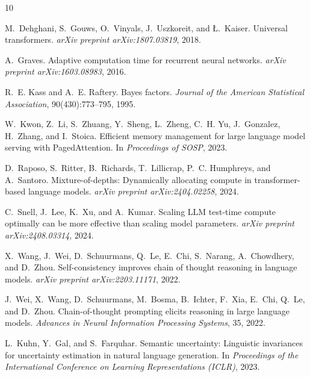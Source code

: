 \documentclass[11pt,a4paper]{article}
\begin{document}
\begin{thebibliography}{10}

M.~Dehghani, S.~Gouws, O.~Vinyals, J.~Uszkoreit, and {\L}.~Kaiser.
\newblock Universal transformers.
\newblock \emph{arXiv preprint arXiv:1807.03819}, 2018.

A.~Graves.
\newblock Adaptive computation time for recurrent neural networks.
\newblock \emph{arXiv preprint arXiv:1603.08983}, 2016.

R.~E. Kass and A.~E. Raftery.
\newblock Bayes factors.
\newblock \emph{Journal of the American Statistical Association}, 90(430):773--795, 1995.

W.~Kwon, Z.~Li, S.~Zhuang, Y.~Sheng, L.~Zheng, C.~H. Yu, J.~Gonzalez, H.~Zhang, and I.~Stoica.
\newblock Efficient memory management for large language model serving with {P}aged{A}ttention.
\newblock In \emph{Proceedings of SOSP}, 2023.

D.~Raposo, S.~Ritter, B.~Richards, T.~Lillicrap, P.~C. Humphreys, and A.~Santoro.
\newblock Mixture-of-depths: Dynamically allocating compute in transformer-based language models.
\newblock \emph{arXiv preprint arXiv:2404.02258}, 2024.

C.~Snell, J.~Lee, K.~Xu, and A.~Kumar.
\newblock Scaling {LLM} test-time compute optimally can be more effective than scaling model parameters.
\newblock \emph{arXiv preprint arXiv:2408.03314}, 2024.

X.~Wang, J.~Wei, D.~Schuurmans, Q.~Le, E.~Chi, S.~Narang, A.~Chowdhery, and D.~Zhou.
\newblock Self-consistency improves chain of thought reasoning in language models.
\newblock \emph{arXiv preprint arXiv:2203.11171}, 2022.

J.~Wei, X.~Wang, D.~Schuurmans, M.~Bosma, B.~Ichter, F.~Xia, E.~Chi, Q.~Le, and D.~Zhou.
\newblock Chain-of-thought prompting elicits reasoning in large language models.
\newblock \emph{Advances in Neural Information Processing Systems}, 35, 2022.

L.~Kuhn, Y.~Gal, and S.~Farquhar.
\newblock Semantic uncertainty: Linguistic invariances for uncertainty estimation in natural language generation.
\newblock In \emph{Proceedings of the International Conference on Learning Representations (ICLR)}, 2023.

\end{thebibliography}
\end{document}
